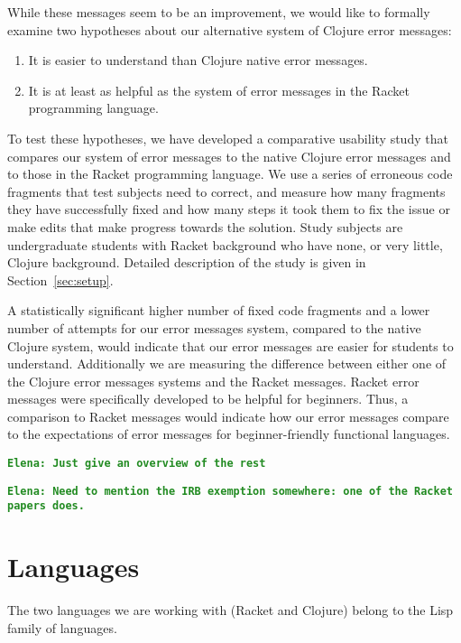 \documentclass[12pt]{article}
\newcommand{\comment}[1]{{\bf \tt  {#1}}}
\newcommand{\emcomment}[1]{\textcolor{ForestGreen}{\comment{Elena: {#1}}}}
\newcommand{\hfcomment}[1]{\textcolor{Teal}{\comment{Henry: {#1}}}}
\begin{document}
While these messages seem to be an improvement, we would like to formally examine two hypotheses about our alternative system of Clojure error messages:
\begin{enumerate}
\item It is easier to understand than Clojure native error messages.
\item It is at least as helpful as the system of error messages in the Racket programming language.
\end{enumerate}
To test these hypotheses, we have developed a comparative usability study that compares our system of error messages to the native Clojure error messages and to those in the Racket programming language. We use a series of erroneous code fragments that test subjects need to correct, and measure how many fragments they have successfully fixed and how many steps it took them to fix the issue or make edits that make progress towards the solution. 
Study subjects are undergraduate students with Racket background who have none, or very little, Clojure background. 
Detailed description of the study is given in Section~\ref{sec:setup}. 

A statistically significant higher number of fixed code fragments and a lower number of attempts for our error messages system, compared to the native Clojure system, would indicate that our error messages are easier for students to understand. Additionally we are measuring the difference between either one of the Clojure error messages systems and the Racket messages. Racket error messages were specifically developed to be helpful for beginners. Thus, a comparison to Racket messages would indicate how our error messages compare to the expectations of error messages for beginner-friendly functional languages. 

\emcomment{Just give an overview of the rest}

\emcomment{Need to mention the IRB exemption somewhere: one of the Racket papers does.}


\section{Languages}\label{sec:lang}
The two languages we are working with (Racket and Clojure) belong to the Lisp family of languages. 
\end{document}
